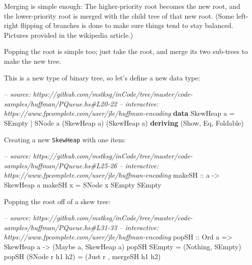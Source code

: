 \documentclass[]{article}
\newenvironment{Shaded}{\begin{snugshade}}{\end{snugshade}}
\newcommand{\CommentTok}[1]{\textcolor[rgb]{0.56,0.35,0.01}{\textit{#1}}}
\newcommand{\DataTypeTok}[1]{\textcolor[rgb]{0.13,0.29,0.53}{#1}}
\newcommand{\FunctionTok}[1]{\textcolor[rgb]{0.00,0.00,0.00}{#1}}
\newcommand{\KeywordTok}[1]{\textcolor[rgb]{0.13,0.29,0.53}{\textbf{#1}}}
\newcommand{\NormalTok}[1]{#1}
\newcommand{\OtherTok}[1]{\textcolor[rgb]{0.56,0.35,0.01}{#1}}
\begin{document}
Merging is simple enough: The higher-priority root becomes the new root, and the
lower-priority root is merged with the child tree of that new root. (Some
left-right flipping of branches is done to make sure things tend to stay
balanced. Pictures provided in the wikipedia article.)

Popping the root is simple too; just take the root, and merge its two sub-trees
to make the new tree.

This is a new type of binary tree, so let's define a new data type:

\begin{Shaded}
\begin{Highlighting}[]
\CommentTok{-- source: https://github.com/mstksg/inCode/tree/master/code-samples/huffman/PQueue.hs#L20-22}
\CommentTok{-- interactive: https://www.fpcomplete.com/user/jle/huffman-encoding}
\KeywordTok{data} \DataTypeTok{SkewHeap}\NormalTok{ a }\FunctionTok{=} \DataTypeTok{SEmpty}
                \FunctionTok{|} \DataTypeTok{SNode}\NormalTok{ a (}\DataTypeTok{SkewHeap}\NormalTok{ a) (}\DataTypeTok{SkewHeap}\NormalTok{ a)}
                \KeywordTok{deriving}\NormalTok{ (}\DataTypeTok{Show}\NormalTok{, }\DataTypeTok{Eq}\NormalTok{, }\DataTypeTok{Foldable}\NormalTok{)}
\end{Highlighting}
\end{Shaded}

Creating a new \texttt{SkewHeap} with one item:

\begin{Shaded}
\begin{Highlighting}[]
\CommentTok{-- source: https://github.com/mstksg/inCode/tree/master/code-samples/huffman/PQueue.hs#L25-26}
\CommentTok{-- interactive: https://www.fpcomplete.com/user/jle/huffman-encoding}
\OtherTok{makeSH ::}\NormalTok{ a }\OtherTok{->} \DataTypeTok{SkewHeap}\NormalTok{ a}
\NormalTok{makeSH x }\FunctionTok{=} \DataTypeTok{SNode}\NormalTok{ x }\DataTypeTok{SEmpty} \DataTypeTok{SEmpty}
\end{Highlighting}
\end{Shaded}

Popping the root off of a skew tree:

\begin{Shaded}
\begin{Highlighting}[]
\CommentTok{-- source: https://github.com/mstksg/inCode/tree/master/code-samples/huffman/PQueue.hs#L31-33}
\CommentTok{-- interactive: https://www.fpcomplete.com/user/jle/huffman-encoding}
\OtherTok{popSH ::} \DataTypeTok{Ord}\NormalTok{ a }\OtherTok{=>} \DataTypeTok{SkewHeap}\NormalTok{ a }\OtherTok{->}\NormalTok{ (}\DataTypeTok{Maybe}\NormalTok{ a, }\DataTypeTok{SkewHeap}\NormalTok{ a)}
\NormalTok{popSH }\DataTypeTok{SEmpty}          \FunctionTok{=}\NormalTok{ (}\DataTypeTok{Nothing}\NormalTok{, }\DataTypeTok{SEmpty}\NormalTok{)}
\NormalTok{popSH (}\DataTypeTok{SNode}\NormalTok{ r h1 h2) }\FunctionTok{=}\NormalTok{ (}\DataTypeTok{Just}\NormalTok{ r , mergeSH h1 h2)}
\end{Highlighting}
\end{Shaded}
\end{document}
